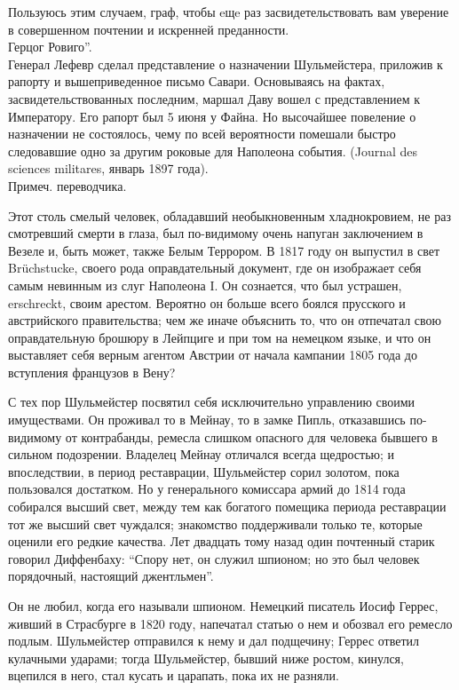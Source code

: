 \documentclass[
  oneside,
  12pt,
  titlepage]{book}
\begin{document}
{  Пользуюсь этим случаем, граф, чтобы eщe раз засвидетельствовать вам уверение в совершенном почтении и искренней преданности.\\
  Герцог Ровиго''.\\
  Генерал Лефевр сделал представление о назначении Шульмейстера, приложив к рапорту и вышеприведенное письмо Савари. Основываясь на фактах, засвидетельствованных последним, маршал Даву вошел с представлением к Императору. Его рапорт был 5 июня у Файна. Но высочайшее повеление о назначении не состоялось, чему по всей вероятности помешали быстро следовавшие одно за другим роковые для Наполеона события. (Journal des sciences militares, январь 1897 года).\\
  Примеч. переводчика}.

Этот столь смелый человек, обладавший необыкновенным хладнокровием, не раз смотревший смерти в глаза, был по-видимому очень напуган заключением в Везеле и, быть может, также Белым Террором. В 1817 году он выпустил в свет Brüchstucke, своего рода оправдательный документ, где он изображает себя самым невинным из слуг Наполеона I. Он сознается, что был устрашен, erschreckt, своим арестом. Вероятно он больше всего боялся прусского и австрийского правительства; чем же иначе объяснить то, что он отпечатал свою оправдательную брошюру в Лейпциге и при том на немецком языке, и что он выставляет себя верным агентом Австрии от начала кампании 1805 года до вступления французов в Вену?

С тех пор Шульмейстер посвятил себя исключительно управлению своими имуществами. Он проживал то в Мейнау, то в замке Пипль, отказавшись по-видимому от контрабанды, ремесла слишком опасного для человека бывшего в сильном подозрении. Владелец Мейнау отличался всегда щедростью; и впоследствии, в период реставрации, Шульмейстер сорил золотом, пока пользовался достатком. Но у генерального комиссара армий до 1814 года собирался высший свет, между тем как богатого помещика периода реставрации тот же высший свет чуждался; знакомство поддерживали только те, которые оценили его редкие качества. Лет двадцать тому назад один почтенный старик говорил Диффенбаху: ``Спору нет, он служил шпионом; но это был человек порядочный, настоящий джентльмен''.

Он не любил, когда его называли шпионом. Немецкий писатель Иосиф Геррес, живший в Страсбурге в 1820 году, напечатал статью о нем и обозвал его ремесло подлым. Шульмейстер отправился к нему и дал подщечину; Геррес ответил кулачными ударами; тогда Шульмейстер, бывший ниже ростом, кинулся, вцепился в него, стал кусать и царапать, пока их не разняли.
\end{document}
